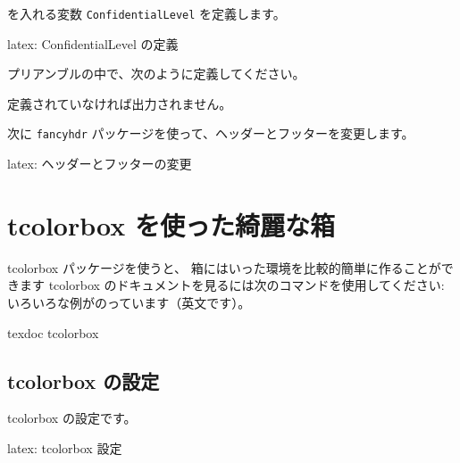 \documentclass[dvipdfmx,a4j,14pt,uplatex,openany]{jsbook}
\begin{document}
を入れる変数 \texttt{ConfidentialLevel} を定義します。

\begin{programlist}[label={org22c8bfd}]{latex}{: ConfidentialLevel の定義}\global\let\@ConfidentialLevel\@empty
\def\ConfidentialLevel#1{\gdef\@ConfidentialLevel{#1}}
\end{programlist}

プリアンブルの中で、次のように定義してください。

\begin{exampleoutput}
\end{exampleoutput}

定義されていなければ出力されません。

次に \texttt{fancyhdr} パッケージを使って、ヘッダーとフッターを変更します。

\begin{programlist}[label={org35dc357}]{latex}{: ヘッダーとフッターの変更}\setlength{\footskip}{10truemm}
\usepackage{fancyhdr}
\pagestyle{fancy}
\fancyhf{}
\lhead{\rightmark}{}
\rhead{}{\leftmark}
\rfoot{%
    \ifx\@ConfidentialLevel\@empty
    \else
      \tcbox[colback=white,colframe=red,size=small,on line]{
        \textcolor{red}{\sffamily \bfseries {\@ConfidentialLevel}}
    }\fi%
  }
\cfoot{\thepage}%
\end{programlist}

\section{tcolorbox を使った綺麗な箱}
\label{sec:org560ecba}
tcolorbox パッケージを使うと、
箱にはいった環境を比較的簡単に作ることができます
tcolorbox のドキュメントを見るには次のコマンドを使用してください:
いろいろな例がのっています（英文です）。

\begin{exampleoutput}
texdoc tcolorbox
\end{exampleoutput}

\subsection{tcolorbox の設定}
\label{sec:orgf35c1ea}
tcolorbox の設定です。

\begin{programlist}[label={org5c2b036}]{latex}{: tcolorbox 設定}\usepackage{tcolorbox}
\tcbEXTERNALIZE
\end{programlist}
\end{document}
